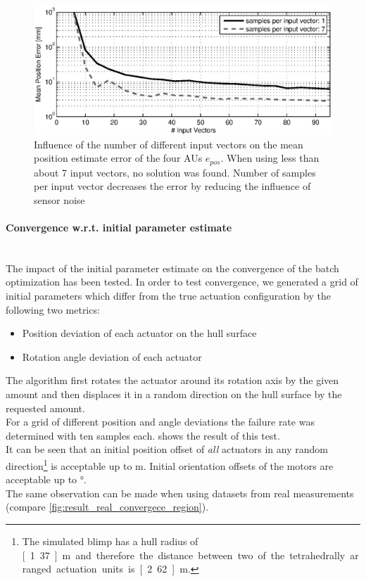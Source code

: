 \begin{figure}[hbtp]
\centering
\includegraphics[width = \textwidth]{images/results/input_length_vs_position_error.eps}
\caption{Influence of the number of different input vectors on the mean position estimate error of the four AUs $e_{pos}$.
When using less than about 7 input vectors, no solution was found.
Number of samples per input vector decreases the error by reducing the influence of sensor noise}
\label{fig:result_inputlength}
\end{figure}

\paragraph{Convergence w.r.t. initial parameter estimate} ~\\
The impact of the initial parameter estimate on the convergence of the batch optimization has been tested.
In order to test convergence, we generated a grid of initial parameters which differ from the true actuation configuration by the following two metrics:
\begin{itemize}
\item Position deviation of each actuator on the hull surface
\item Rotation angle deviation of each actuator
\end{itemize}
The algorithm first rotates the actuator around its rotation axis by the given amount and then displaces it in a random direction on the hull surface by the requested amount. \\
For a grid of different position and angle deviations the failure rate was determined with ten samples each.
 shows the result of this test.\\
It can be seen that an initial position offset of \textit{all} actuators in any random direction\footnote{
The simulated blimp has a hull radius of \unit[1.37]{m} and therefore the distance between two of the tetrahedrally arranged actuation units is \unit[2.62]{m}.}
is acceptable up to \unit[1]{m}.
Initial orientation offsets of the motors are acceptable up to \unit[120]{°}.
\\
The same observation can be made when using datasets from real measurements (compare \cref{fig:result_real_convergece_region}).


